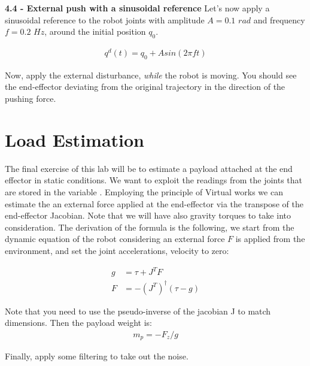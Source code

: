 \documentclass[11pt]{article}
\begin{document}
\textbf{4.4 - External push with a sinusoidal reference}
Let's now apply a sinusoidal reference to the robot joints  with amplitude $A= 0.1$ $rad$ and frequency $f = 0.2$ $Hz$, around the initial position $q_0$.

\begin{align*}
q^d(t) = q_0 + Asin(2\pi f t )
\end{align*} 

Now, apply the external disturbance, \textit{while} the robot is moving. You should see the end-effector deviating from the original trajectory in the direction of the pushing force. 
 



\section{Load Estimation}
The final exercise of this lab will be to estimate a payload attached at the end effector in static conditions. We want to exploit the readings from the  joints that are stored in the variable . Employing the principle of Virtual works we can estimate the an external force applied at the end-effector via the transpose of the end-effector Jacobian. Note that we will have also gravity torques to take into consideration.
The derivation of the formula is the following, we start from the dynamic equation of the robot considering an external force $F$ is applied from the environment, and set the joint accelerations, velocity to zero:

\begin{align*}
g &= \tau  + J^TF \\
F &= -(J^T)^\dagger (\tau - g) 
\end{align*}

Note that you need to use the pseudo-inverse of the jacobian J to match dimensions.  Then the payload weight is:
\begin{align*}
m_p = -F_z / g 
\end{align*}

Finally, apply some filtering to take out the noise. 
\end{document}
